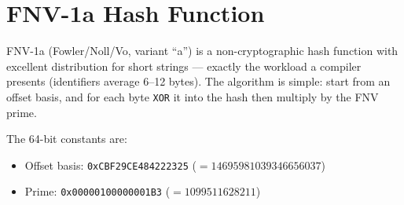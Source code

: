 \documentclass[11pt,a4paper,twoside,openright,DIV=15]{scrbook}
\theoremstyle{definition}
\theoremstyle{plain}
\theoremstyle{remark}
\begin{document}
\section{FNV-1a Hash Function}

FNV-1a (Fowler/Noll/Vo, variant ``a'') is a non-cryptographic hash
function with excellent distribution for short strings --- exactly the
workload a compiler presents (identifiers average 6--12 bytes).  The
algorithm is simple: start from an offset basis, and for each byte
\texttt{XOR} it into the hash then multiply by the FNV prime.

The 64-bit constants are:
\begin{itemize}
\item Offset basis: \texttt{0xCBF29CE484222325} ($= 14695981039346656037$)
\item Prime: \texttt{0x00000100000001B3} ($= 1099511628211$)
\end{itemize}
\end{document}
